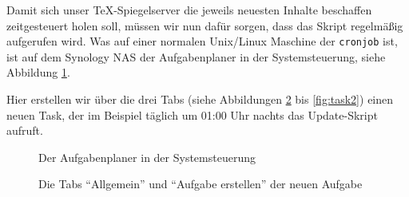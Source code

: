 \documentclass{dtk}
\begin{document}
Damit sich unser \TeX-Spiegelserver die jeweils neuesten Inhalte beschaffen zeitgesteuert holen soll, müssen wir nun dafür sorgen, dass das Skript regelmäßig aufgerufen wird. Was auf einer normalen Unix/Linux Maschine der \texttt{cronjob} ist, ist auf dem Synology NAS der Aufgabenplaner in der Systemsteuerung, siehe Abbildung \ref{fig:tasks}.

Hier erstellen wir über die drei Tabs (siehe Abbildungen \ref{fig:task1} bis \ref{fig:task2}) einen neuen Task, der im Beispiel täglich um 01:00 Uhr nachts das Update-Skript aufruft.

\begin{figure}
\begin{center}
\caption{Der Aufgabenplaner in der Systemsteuerung}\label{fig:tasks}
\end{center}
\end{figure}

\begin{figure}
\begin{center}
\caption{Die Tabs \enquote{Allgemein} und \enquote{Aufgabe erstellen} der neuen Aufgabe}\label{fig:task1}
\end{center}
\end{figure}
\end{document}
